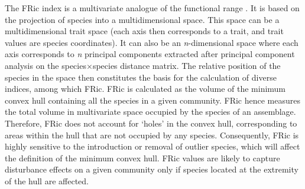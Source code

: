 The FRic index is a multivariate analogue of the functional range \citep{Legras2018, Villeger2008, Schleuter2010}. It is based on the projection of species into a multidimensional space. This space can be a multidimensional trait space (each axis then corresponds to a trait, and trait values are species coordinates). It can also be an \textit{n}-dimensional space where each axis corresponds to \textit{n} principal components extracted after principal component analysis on the species$\times$species distance matrix. The relative position of the species in the space then constitutes the basis for the calculation of diverse indices, among which FRic. FRic is calculated as the volume of the minimum convex hull containing all the species in a given community. FRic hence measures the total volume in multivariate space occupied by the species of an assemblage. Therefore, FRic does not account for `holes' in the convex hull, corresponding to areas within the hull that are not occupied by any species. Consequently, FRic is highly sensitive to the introduction or removal of outlier species, which will affect the definition of the minimum convex hull. FRic values are likely to capture disturbance effects on a given community only if species located at the extremity of the hull are affected.
\vspace{0.5cm}

